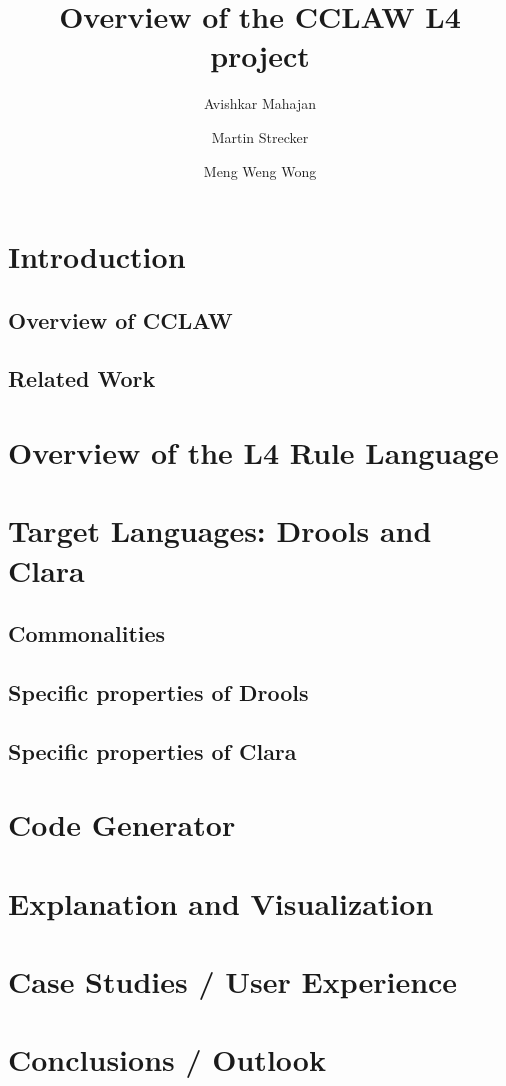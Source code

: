\documentclass[10pt,a4paper]{article}
\begin{document}
\title{Overview of the CCLAW L4 project}
\author{Avishkar Mahajan} 
\author{Martin Strecker} 
\author{Meng Weng Wong}

\maketitle

\section{Introduction}

\subsection{Overview of CCLAW}

\subsection{Related Work}


\section{Overview of the L4 Rule Language}

\section{Target Languages: Drools and Clara}


\subsection{Commonalities}

\subsection{Specific properties of Drools}

\subsection{Specific properties of Clara}

\section{Code Generator}

\section{Explanation and Visualization}

\section{Case Studies / User Experience}

\cite{CCLAW_project}

\section{Conclusions / Outlook}
\end{document}
